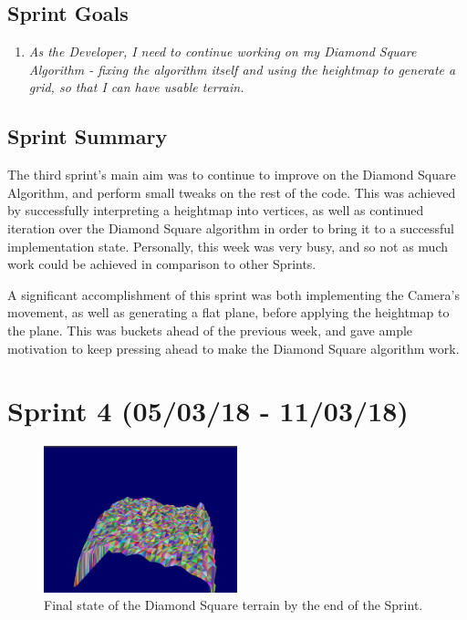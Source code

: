 \documentclass[a4paper,10pt]{report}
\begin{document}
\subsection{Sprint Goals}
\begin{enumerate}
    \item \textit{As the Developer, I need to continue working on my Diamond Square Algorithm - fixing the algorithm itself and using the heightmap to generate a grid, so that I can have usable terrain. }
\end{enumerate}
\subsection{Sprint Summary}
The third sprint's main aim was to continue to improve on the Diamond Square Algorithm, and perform small tweaks on the rest of the code. This was achieved by successfully interpreting a heightmap into vertices, as well as continued iteration over the Diamond Square algorithm in order to bring it to a successful implementation state. Personally, this week was very busy, and so not as much work could be achieved in comparison to other Sprints. \medskip

A significant accomplishment of this sprint was both implementing the Camera's movement, as well as generating a flat plane, before applying the heightmap to the plane. This was buckets ahead of the previous week, and gave ample motivation to keep pressing ahead to make the Diamond Square algorithm work. 

\clearpage
\section{Sprint 4 (05/03/18 - 11/03/18)}

\begin{figure}[h!]
    \centering
  \includegraphics[width=0.5\textwidth]{Images/Sprint-Images/Sprint4-7.png}
 \caption{Final state of the Diamond Square terrain by the end of the Sprint.}
 \label{fig:sprint4-1}
\end{figure}
\end{document}
